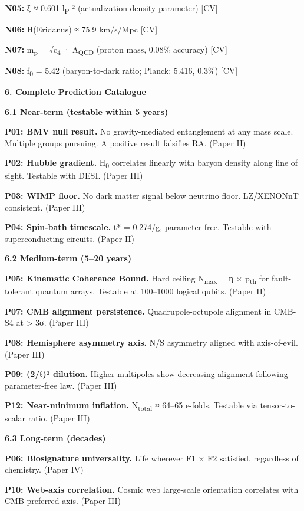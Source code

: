 \documentclass[12pt,a4paper]{article}
\begin{document}
\textbf{N05:} ξ ≈ 0.601 l\textsubscript{P}⁻² (actualization density
parameter) {[}CV{]}

\textbf{N06:} H(Eridanus) ≈ 75.9 km/s/Mpc {[}CV{]}

\textbf{N07:} m\textsubscript{p} = √c\textsubscript{4} ·
Λ\textsubscript{QCD} (proton mass, 0.08\% accuracy) {[}CV{]}

\textbf{N08:} f\textsubscript{0} = 5.42 (baryon-to-dark ratio; Planck:
5.416, 0.3\%) {[}CV{]}

\textbf{6. Complete Prediction Catalogue}

\textbf{6.1 Near-term (testable within 5 years)}

\textbf{P01: BMV null result.} No gravity-mediated entanglement at any
mass scale. Multiple groups pursuing. A positive result falsifies RA.
(Paper II)

\textbf{P02: Hubble gradient.} H\textsubscript{0} correlates linearly
with baryon density along line of sight. Testable with DESI. (Paper III)

\textbf{P03: WIMP floor.} No dark matter signal below neutrino floor.
LZ/XENONnT consistent. (Paper III)

\textbf{P04: Spin-bath timescale.} t* = 0.274/g, parameter-free.
Testable with superconducting circuits. (Paper II)

\textbf{6.2 Medium-term (5--20 years)}

\textbf{P05: Kinematic Coherence Bound.} Hard ceiling
N\textsubscript{max} = η × p\textsubscript{th} for fault-tolerant
quantum arrays. Testable at 100--1000 logical qubits. (Paper II)

\textbf{P07: CMB alignment persistence.} Quadrupole-octupole alignment
in CMB-S4 at \textgreater{} 3σ. (Paper III)

\textbf{P08: Hemisphere asymmetry axis.} N/S asymmetry aligned with
axis-of-evil. (Paper III)

\textbf{P09: (2/ℓ)² dilution.} Higher multipoles show decreasing
alignment following parameter-free law. (Paper III)

\textbf{P12: Near-minimum inflation.} N\textsubscript{total} ≈ 64--65
e-folds. Testable via tensor-to-scalar ratio. (Paper III)

\textbf{6.3 Long-term (decades)}

\textbf{P06: Biosignature universality.} Life wherever F1 × F2
satisfied, regardless of chemistry. (Paper IV)

\textbf{P10: Web-axis correlation.} Cosmic web large-scale orientation
correlates with CMB preferred axis. (Paper III)
\end{document}
